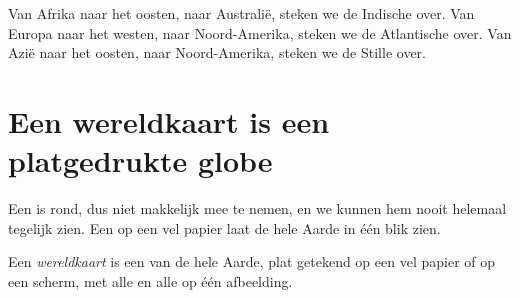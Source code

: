 \begin{example}\label{ex:g3:continents-and-oceans:africa-australia}
Van Afrika naar het oosten, naar Australië, steken we de Indische 
over. Van Europa naar het westen, naar Noord-Amerika, steken we de
Atlantische  over. Van Azië naar het oosten, naar Noord-Amerika,
steken we de Stille  over.
\end{example}

\section{Een wereldkaart is een platgedrukte globe}

Een  is rond, dus niet makkelijk mee te nemen, en we kunnen hem nooit
helemaal tegelijk zien. Een  op een vel papier laat de hele Aarde in
één blik zien.

\begin{definition}[Wereldkaart]\label{def:g3:continents-and-oceans:world-map}
Een \emph{wereldkaart} is een  van de hele Aarde,
plat getekend op een vel papier of op een scherm, met alle  en
alle  op één afbeelding.
\end{definition}

